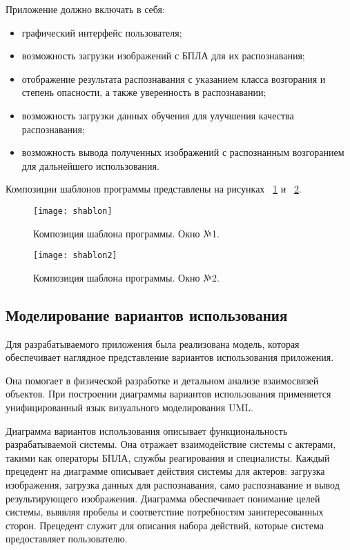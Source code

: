 Приложение должно включать в себя:
\begin{itemize}
    \item графический интерфейс пользователя;
    \item возможность загрузки изображений с БПЛА для их распознавания;
    \item отображение результата распознавания с указанием класса возгорания и степень опасности, а также уверенность в распознавании;
    \item возможность загрузки данных обучения для улучшения качества распознавания;
    \item возможность вывода полученных изображений с распознанным возгоранием для дальнейшего использования.
\end{itemize}

Композиции шаблонов программы представлены на рисунках ~\ref{shablon:image} и ~\ref{shablon2:image}.

\begin{figure}[ht]
\texttt{[image: shablon]}
\caption{Композиция шаблона программы. Окно №1.}
\label{shablon:image}
\end{figure}

\begin{figure}[H]
\texttt{[image: shablon2]}
\caption{Композиция шаблона программы. Окно №2.}
\label{shablon2:image}
\end{figure}

\subsection{Моделирование вариантов использования}

Для разрабатываемого приложения была реализована модель, которая обеспечивает наглядное представление вариантов использования приложения.

Она помогает в физической разработке и детальном анализе взаимосвязей объектов. При построении диаграммы вариантов использования применяется унифицированный язык визуального моделирования UML.

Диаграмма вариантов использования описывает функциональность разрабатываемой системы. Она отражает взаимодействие системы с актерами, такими как операторы БПЛА, службы реагирования и специалисты. Каждый прецедент на диаграмме описывает действия системы для актеров: загрузка изображения, загрузка данных для распознавания, само распознавание и вывод результирующего изображения. Диаграмма обеспечивает понимание целей системы, выявляя пробелы и соответствие потребностям заинтересованных сторон. Прецедент служит для описания набора действий, которые система предоставляет пользователю.

